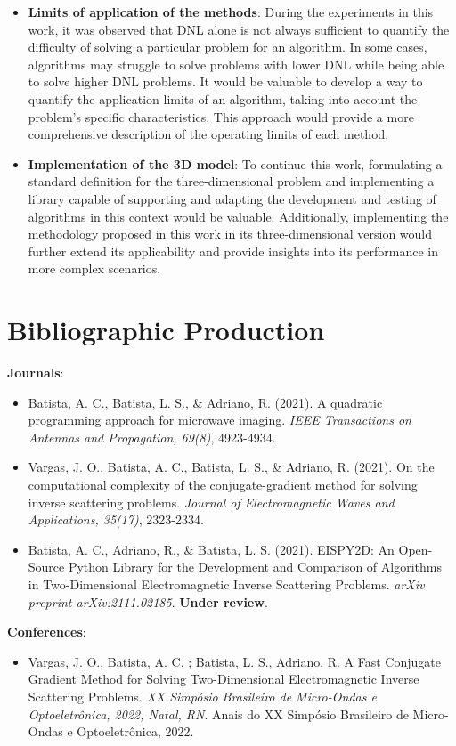\begin{itemize}
			\item\textbf{Limits of application of the methods}: During the experiments in this work, it was observed that DNL alone is not always sufficient to quantify the difficulty of solving a particular problem for an algorithm. In some cases, algorithms may struggle to solve problems with lower DNL while being able to solve higher DNL problems. It would be valuable to develop a way to quantify the application limits of an algorithm, taking into account the problem's specific characteristics. This approach would provide a more comprehensive description of the operating limits of each method.
			\item\textbf{Implementation of the 3D model}: To continue this work, formulating a standard definition for the three-dimensional problem and implementing a library capable of supporting and adapting the development and testing of algorithms in this context would be valuable. Additionally, implementing the methodology proposed in this work in its three-dimensional version would further extend its applicability and provide insights into its performance in more complex scenarios.
		\end{itemize}
	
	\section{Bibliographic Production}\label{chap:final:production}
	
		\noindent\textbf{Journals}:
		\vspace{5mm}
		\begin{itemize}
			\item Batista, A. C., Batista, L. S., \& Adriano, R. (2021). A quadratic programming approach for microwave imaging. \textit{IEEE Transactions on Antennas and Propagation, 69(8)}, 4923-4934.
			\item Vargas, J. O., Batista, A. C., Batista, L. S., \& Adriano, R. (2021). On the computational complexity of the conjugate-gradient method for solving inverse scattering problems. \textit{Journal of Electromagnetic Waves and Applications, 35(17)}, 2323-2334.
			\item Batista, A. C., Adriano, R., \& Batista, L. S. (2021). EISPY2D: An Open-Source Python Library for the Development and Comparison of Algorithms in Two-Dimensional Electromagnetic Inverse Scattering Problems. \textit{arXiv preprint arXiv:2111.02185}. \textbf{Under review}.		
		\end{itemize}
		\vspace{5mm}
		\noindent\textbf{Conferences}:
		\vspace{5mm}
		\begin{itemize}
			\item Vargas, J. O., Batista, A. C. ; Batista, L. S., Adriano, R. A Fast Conjugate Gradient Method for Solving Two-Dimensional Electromagnetic Inverse Scattering Problems. \textit{XX Simpósio Brasileiro de Micro-Ondas e Optoeletrônica, 2022, Natal, RN}. Anais do XX Simpósio Brasileiro de Micro-Ondas e Optoeletrônica, 2022. 
		\end{itemize}
		
